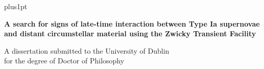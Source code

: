\documentclass[a4paper,oneside,12pt]{Latex/Classes/PhDthesisPSnPDF}
\begin{document}

\renewcommand\baselinestretch{1.2}
\baselineskip=18pt plus1pt


\newcommand{\titlefont}{\bfseries \fontsize{22}{26.42pt}\selectfont}
\newcommand{\largetitlefont}{\bfseries \fontsize{29.88}{35.88pt}\selectfont}
\newcommand{\othertitlefont}{\fontsize{14.4}{17.28}\selectfont}
\newcommand{\authorfont}{\bfseries \fontsize{14.4}{17.28}\selectfont}
\newcommand{\informationfont}{\fontsize{10}{12}\selectfont}
\newcommand{\dedicationfont}{\slshape \fontsize{14.4}{17.28}\selectfont}

\newcommand{\thisyear}{\number\year}
\def\thismonth{\ifcase\month\or January\or February\or March\or
  April\or May\or June\or July\or August\or September\or October\or November\or December\fi}
\newcommand{\todaysdate}{\thismonth\space \thisyear}

\renewcommand{\baselinestretch}{1}
\newpage \thispagestyle{empty}
\begin{flushright}



\Huge{\textbf{A search for signs of late-time interaction between Type Ia supernovae and distant circumstellar material using the Zwicky Transient Facility}}

\end{flushright}

\vspace*{2cm}
\begin{flushright}
A dissertation submitted to the University of Dublin \\
for the degree of Doctor of Philosophy
\end{flushright}
\end{document}
